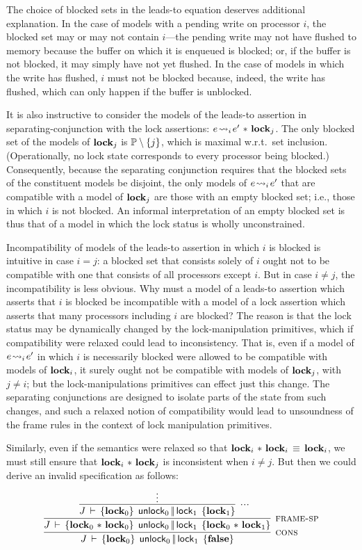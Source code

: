 \documentclass[11pt]{report}
\begin{document}
\begin{remark}
The choice of blocked sets in the leads-to equation deserves additional explanation. In the case of models with a pending write on processor $i$, the blocked set may or may not contain $i$---the pending write may not have flushed to memory because the buffer on which it is enqueued is blocked; or, if the buffer is not blocked, it may simply have not yet flushed. In the case of models in which the write has flushed, $i$ must not be blocked because, indeed, the write has flushed, which can only happen if the buffer is unblocked.

It is also instructive to consider the models of the leads-to assertion in separating-conjunction with the lock assertions: $e \!\leadsto_{i}\! e' \operatorname{\,\ast\,} \mathbf{lock}_{j}$. The only blocked set of the models of $\mathbf{lock}_{j}$ is $\mathbb{P} \setminus \left\lbrace j \right\rbrace$, which is maximal w.r.t.\ set inclusion. (Operationally, no lock state corresponds to every processor being blocked.) Consequently, because the separating conjunction requires that the blocked sets of the constituent models be disjoint, the only models of $e \!\leadsto_{i}\! e'$ that are compatible with a model of $\mathbf{lock}_{j}$ are those with an empty blocked set; i.e., those in which $i$ is not blocked. An informal interpretation of an empty blocked set is thus that of a model in which the lock status is wholly unconstrained. 

Incompatibility of models of the leads-to assertion in which $i$ is blocked is intuitive in case $i = j$: a blocked set that consists solely of $i$ ought not to be compatible with one that consists of all processors except $i$. But in case $i \neq j$, the incompatibility is less obvious. Why must a model of a leads-to assertion which asserts that $i$ is blocked be incompatible with a model of a lock assertion which asserts that many processors including $i$ are blocked? The reason is that the lock status may be dynamically changed by the lock-manipulation primitives, which if compatibility were relaxed could lead to inconsistency. That is, even if a model of $e \!\leadsto_{i}\! e'$ in which $i$ is necessarily blocked were allowed to be compatible with models of $\mathbf{lock}_{i}$, it surely ought not be compatible with models of $\mathbf{lock}_{j}$, with $j \neq i$; but the lock-manipulations primitives can effect just this change. The separating conjunctions are designed to isolate parts of the state from such changes, and such a relaxed notion of compatibility would lead to unsoundness of the frame rules in the context of lock manipulation primitives. 

Similarly, even if the semantics were relaxed so that $\mathbf{lock}_{i} \operatorname{\,\ast\,} \mathbf{lock}_{i} \,\equiv\, \mathbf{lock}_{i}$, we must still ensure that $\mathbf{lock}_{i} \operatorname{\,\ast\,} \mathbf{lock}_{j}$ is inconsistent when $i \neq j$. But then we could derive an invalid specification as follows: \[ \infer[\textsc{cons}]{\spec{J}{\flock{0}}{\cunlock_0 \oppar \clock_1}{\bexpf}}{\infer[\textsc{frame-sp}]{\spec{J}{\flock{0} \fsep \flock{0}}{\cunlock_0 \oppar \clock_1}{\flock{0} \fsep \flock{1}}}{\infer[\textsc{...}]{\spec{J}{\flock{0}}{\cunlock_0 \oppar \clock_1}{\flock{1}}}{\vdots}}}\] \qedsymbol \\ 
\end{remark}
\end{document}
